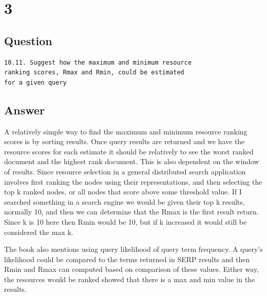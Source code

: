 \documentclass[letterpaper,11pt]{article}
\newcommand*{\srcPath}{../src}%
\begin{document}
% 

\clearpage


\section*{3}

\subsection*{Question}

\begin{verbatim}
10.11. Suggest how the maximum and minimum resource 
ranking scores, Rmax and Rmin, could be estimated 
for a given query
\end{verbatim}

\subsection*{Answer}

A relatively simple way to find the maximum and minimum resource ranking scores is by sorting results.
Once query results are returned and we have the resource scores for each estimate it should be relatively to see the worst ranked document and the highest rank document.
This is also dependent on the window of results.
Since resource selection in a general distributed search application involves first
ranking the nodes using their representations, and then selecting the top k ranked
nodes, or all nodes that score above some threshold value.
If I searched something in a search engine we would be given their top k results, normally 10, and then we can determine that the Rmax is the first result return.
Since k is 10 here then Rmin would be 10, but if k increased it would still be considered the max k.

The book also mentions using query likelihood of query term frequency.
A query's likelihood could be compared to the terms returned in SERP results and then Rmin and Rmax can computed based on comparison of these values.
Either way, the resources would be ranked showed that there is a max and min value in the results.
\end{document}
